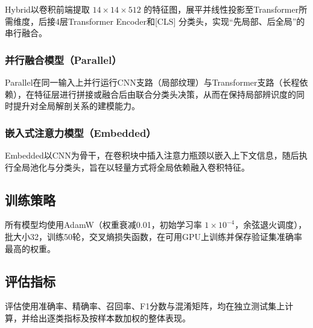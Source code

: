 Hybrid以卷积前端提取 $14 \times 14 \times 512$ 的特征图，展平并线性投影至Transformer所需维度，后接4层Transformer Encoder和[CLS] 分类头，实现“先局部、后全局”的串行融合。

\subsubsection{并行融合模型（Parallel）}

Parallel在同一输入上并行运行CNN支路（局部纹理）与Transformer支路（长程依赖），在特征层进行拼接或融合后由联合分类头决策，从而在保持局部辨识度的同时提升对全局解剖关系的建模能力。

\subsubsection{嵌入式注意力模型（Embedded）}

Embedded以CNN为骨干，在卷积块中插入注意力瓶颈以嵌入上下文信息，随后执行全局池化与分类头，旨在以轻量方式将全局依赖融入卷积特征。

\subsection{训练策略}

所有模型均使用AdamW（权重衰减0.01，初始学习率 $1 \times 10^{-4}$，余弦退火调度），批大小32，训练50轮，交叉熵损失函数，在可用GPU上训练并保存验证集准确率最高的权重。

\subsection{评估指标}

评估使用准确率、精确率、召回率、F1分数与混淆矩阵，均在独立测试集上计算，并给出逐类指标及按样本数加权的整体表现。
